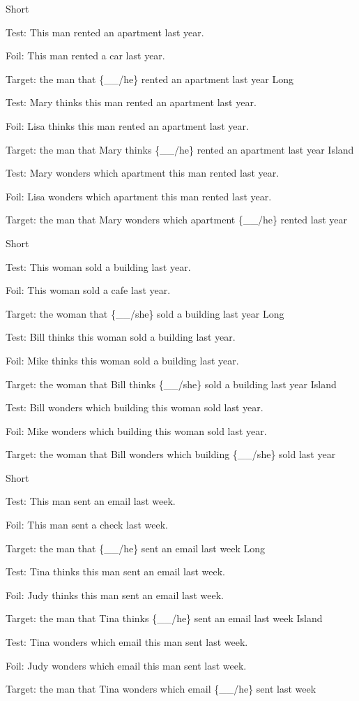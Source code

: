 \pex %
\a Short\par\nobreak
Test: This man rented an apartment last year.\par\nobreak
Foil: This man rented a car last year.\par\nobreak
Target: the man that \{\_\_/he\} rented an apartment last year
\a Long\par\nobreak
Test: Mary thinks this man rented an apartment last year.\par\nobreak
Foil: Lisa thinks this man rented an apartment last year.\par\nobreak
Target: the man that Mary thinks \{\_\_/he\} rented an apartment last year
\a Island\par\nobreak
Test: Mary wonders which apartment this man rented last year.\par\nobreak
Foil: Lisa wonders which apartment this man rented last year.\par\nobreak
Target: the man that Mary wonders which apartment \{\_\_/he\} rented last year
\xe

\pex %
\a Short\par\nobreak
Test: This woman sold a building last year.\par\nobreak
Foil: This woman sold a cafe last year.\par\nobreak
Target: the woman that \{\_\_/she\} sold a building last year
\a Long\par\nobreak
Test: Bill thinks this woman sold a building last year.\par\nobreak
Foil: Mike thinks this woman sold a building last year.\par\nobreak
Target: the woman that Bill thinks \{\_\_/she\} sold a building last year
\a Island\par\nobreak
Test: Bill wonders which building this woman sold last year.\par\nobreak
Foil: Mike wonders which building this woman sold last year.\par\nobreak
Target: the woman that Bill wonders which building \{\_\_/she\} sold last year
\xe

\pex %
\a Short\par\nobreak
Test: This man sent an email last week.\par\nobreak
Foil: This man sent a check last week.\par\nobreak
Target: the man that \{\_\_/he\} sent an email last week
\a Long\par\nobreak
Test: Tina thinks this man sent an email last week.\par\nobreak
Foil: Judy thinks this man sent an email last week.\par\nobreak
Target: the man that Tina thinks \{\_\_/he\} sent an email last week
\a Island\par\nobreak
Test: Tina wonders which email this man sent last week.\par\nobreak
Foil: Judy wonders which email this man sent last week.\par\nobreak
Target: the man that Tina wonders which email \{\_\_/he\} sent last week
\xe

